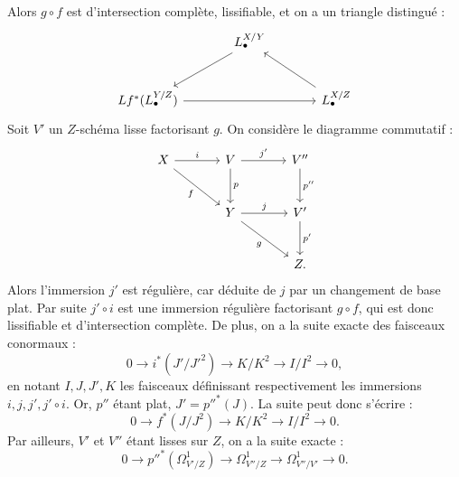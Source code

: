 \documentclass[11pt]{article}
\begin{document}
Alors $g\circ f$ est d'intersection complète, lissifiable, et on a un triangle distingué :
\[
\begin{tikzcd}[column sep=large,row sep=large]
& L^{X/Y}_\bullet \arrow[dl] \\
Lf^*(L^{Y/Z}_\bullet) \arrow[rr] && L^{X/Z}_\bullet \arrow[ul]
\end{tikzcd}
\]
Soit $V'$ un $Z$-schéma lisse factorisant $g$. On considère le diagramme commutatif :
\[
\begin{tikzcd}[column sep=large,row sep=large]
X \arrow[r,"i"] \arrow[dr,"f"'] & V \arrow[r,"j'"] \arrow[d,"p"] & V'' \arrow[d,"p''"]\\
& Y \arrow[r,"j"] \arrow[dr,"g"'] & V' \arrow[d,"p'"]\\
& & Z .
\end{tikzcd}
\]
Alors l'immersion $j'$ est régulière, car déduite de $j$ par un changement de base plat. Par suite $j'\circ i$ est une immersion régulière factorisant $g\circ f$, qui est donc lissifiable et d'intersection complète. De plus, on a la suite exacte des faisceaux conormaux :
\[
0\longrightarrow i^*(J'/J'^2)\longrightarrow K/K^2\longrightarrow I/I^2\longrightarrow0,
\]
en notant $I,J,J',K$ les faisceaux définissant respectivement les immersions $i,j,j',j'\circ i$. Or, $p''$ étant plat, $J'=p''^*(J)$. La suite peut donc s'écrire :
\begin{equation}\tag{2.6.1}
0\longrightarrow f^*(J/J^2)\longrightarrow K/K^2\longrightarrow I/I^2\longrightarrow0.
\end{equation}
Par ailleurs, $V'$ et $V''$ étant lisses sur $Z$, on a la suite exacte :
\[
0\longrightarrow p''^*(\Omega^1_{V'/Z})\longrightarrow\Omega^1_{V''/Z}\longrightarrow\Omega^1_{V''/V'}\longrightarrow0.
\]
\end{document}
